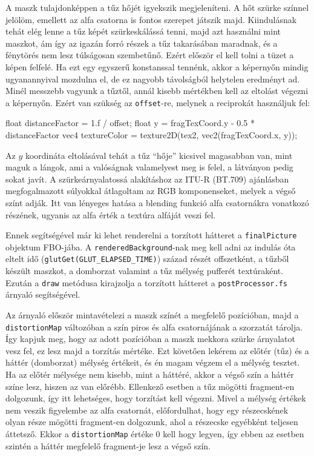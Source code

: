 A maszk tulajdonképpen a tűz hőjét igyekszik megjeleníteni. A hőt szürke színnel jelölöm, emellett az alfa csatorna is fontos szerepet játszik majd. Kiindulásnak tehát elég lenne a tűz képét szürkeskálássá tenni, majd azt használni mint maszkot, ám így az igazán forró részek a tűz takarásában maradnak, és a fénytörés nem lesz túlságosan szembetűnő. Ezért először el kell tolni a tüzet a képen felfelé. Ha ezt egy egyszerű konstanssal tennénk, akkor a képernyőn mindig ugyanannyival mozdulna el, de ez nagyobb távolságból helytelen eredményt ad. Minél messzebb vagyunk a tűztől, annál kisebb mértékben kell az eltolást végezni a képernyőn. Ezért van szükség az \texttt{offset}-re, melynek a reciprokát használjuk fel:
\begin{cpp}
float distanceFactor = 1.f / offset;
float y = fragTexCoord.y - 0.5 * distanceFactor
vec4 textureColor = texture2D(tex2, vec2(fragTexCoord.x, y));
\end{cpp}
Az $y$ koordináta eltolásával tehát a tűz ``hője'' kicsivel magasabban van, mint maguk a lángok, ami a valóságnak valamelyest meg is felel, a látványon pedig sokat javít. A szürkeárnyalatossá alakításhoz az ITU-R (BT.709) ajánlásban megfogalmazott súlyokkal átlagoltam az RGB komponenseket, melyek a végső színt adják. Itt van lényeges hatása a blending funkció alfa csatornákra vonatkozó részének, ugyanis az alfa érték a textúra alfáját veszi fel.

Ennek segítségével már ki lehet renderelni a torzított hátteret a \texttt{finalPicture} objektum FBO-jába. A \texttt{renderedBackground}-nak meg kell adni az indulás óta eltelt idő (\texttt{glutGet(GLUT\_ELAPSED\_TIME)}) század részét offszetként, a tűzből készült maszkot, a domborzat valamint a tűz mélység pufferét textúraként. Ezután a \texttt{draw} metódusa kirajzolja a torzított hátteret a \texttt{postProcessor.fs} árnyaló segítségével.

Az árnyaló először mintavételezi a maszk színét a megfelelő pozícióban, majd a \texttt{distortionMap} változóban a szín piros és alfa csatornájának a szorzatát tárolja. Így kapjuk meg, hogy az adott pozícióban a maszk mekkora szürke árnyalatot vesz fel, ez lesz majd a torzítás mértéke. 
Ezt követően lekérem az előtér (tűz) és a háttér (domborzat) mélység értékeit, és én magam végzem el a mélység tesztet. Ha az előtér mélysége nem kisebb, mint a háttéré, akkor a végső szín a háttér színe lesz, hiszen az van előrébb. Ellenkező esetben a tűz mögötti fragment-en dolgozunk, így itt lehetséges, hogy torzítást kell végezni. Mivel a mélység értékek nem veszik figyelembe az alfa csatornát, előfordulhat, hogy egy részecskének olyan része mögötti fragment-en dolgozunk, ahol a részecske egyébként teljesen áttetsző. Ekkor a \texttt{distortionMap} értéke $0$ kell hogy legyen, így ebben az esetben szintén a háttér megfelelő fragment-je lesz a végső szín. 

